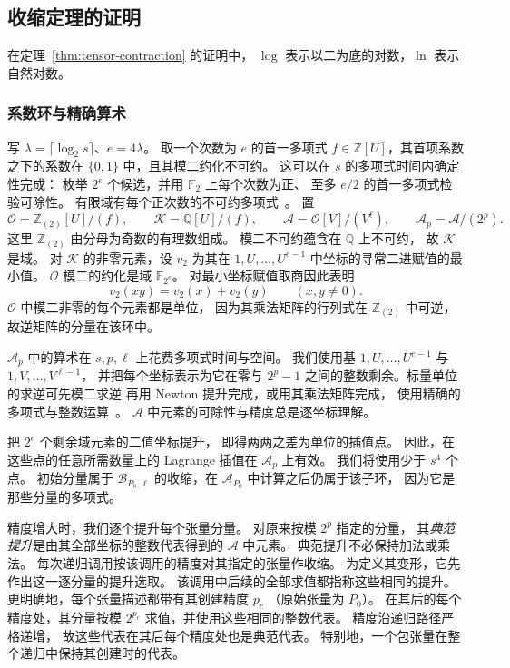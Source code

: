 \subsection{收缩定理的证明}
\label{app:tensor}

在定理~\ref{thm:tensor-contraction} 的证明中，
$\log$ 表示以二为底的对数，$\ln$ 表示自然对数。

\subsubsection{系数环与精确算术}
\label{subsec:tensor-arithmetic}

写 $\lambda=\lceil\log_2 s\rceil$、$e=4\lambda$。
取一个次数为 $e$ 的首一多项式
$f\in\mathbb Z[U]$，其首项系数之下的系数在 $\{0,1\}$
中，且其模二约化不可约。
这可以在 $s$ 的多项式时间内确定性完成：
枚举 $2^e$ 个候选，并用 $\mathbb F_2$ 上每个次数为正、
至多 $e/2$ 的首一多项式检验可除性。
有限域有每个正次数的不可约多项式~\cite{vzGG13}。
置
\[
 \mathcal O=\mathbb Z_{(2)}[U]/(f),\qquad
 \mathcal K=\mathbb Q[U]/(f),\qquad
 \mathcal A=\mathcal O[V]/(V^\ell),\qquad
 \mathcal A_p=\mathcal A/(2^p).
\]
这里 $\mathbb Z_{(2)}$
由分母为奇数的有理数组成。
模二不可约蕴含在 $\mathbb Q$ 上不可约，
故 $\mathcal K$ 是域。
对 $\mathcal K$ 的非零元素，设 $v_2$
为其在 $1,U,\ldots,U^{e-1}$
中坐标的寻常二进赋值的最小值。
$\mathcal O$ 模二的约化是域 $\mathbb F_{2^e}$。
对最小坐标赋值取商因此表明
\[
 v_2(xy)=v_2(x)+v_2(y)\qquad(x,y\ne0).
\]
$\mathcal O$ 中模二非零的每个元素都是单位，
因为其乘法矩阵的行列式在 $\mathbb Z_{(2)}$
中可逆，故逆矩阵的分量在该环中。

$\mathcal A_p$ 中的算术在 $s,p,\ell$
上花费多项式时间与空间。
我们使用基 $1,U,\ldots,U^{e-1}$
与 $1,V,\ldots,V^{\ell-1}$，
并把每个坐标表示为它在零与 $2^p-1$
之间的整数剩余。标量单位的求逆可先模二求逆
再用 Newton 提升完成，或用其乘法矩阵完成，
使用精确的多项式与整数运算~\cite{vzGG13}。
$\mathcal A$ 中元素的可除性与精度总是逐坐标理解。

把 $2^e$ 个剩余域元素的二值坐标提升，
即得两两之差为单位的插值点。
因此，在这些点的任意所需数量上的 Lagrange
插值在 $\mathcal A_p$ 上有效。
我们将使用少于 $s^4$ 个点。
初始分量属于 $\mathcal B_{P_0,\ell}$
的收缩，在 $\mathcal A_{P_0}$ 中计算之后仍属于该子环，
因为它是那些分量的多项式。

精度增大时，我们逐个提升每个张量分量。
对原来按模 $2^p$ 指定的分量，
其\emph{典范提升}是由其全部坐标的整数代表得到的
$\mathcal A$ 中元素。
典范提升不必保持加法或乘法。
每次递归调用按该调用的精度对其指定的张量作收缩。
为定义其变形，它先作出这一逐分量的提升选取。
该调用中后续的全部求值都指称这些相同的提升。
更明确地，每个张量描述都带有其创建精度 $p_c$
（原始张量为 $P_0$）。
在其后的每个精度处，其分量按模 $2^{p_c}$
求值，并使用这些相同的整数代表。
精度沿递归路径严格递增，
故这些代表在其后每个精度处也是典范代表。
特别地，一个包张量在整个递归中保持其创建时的代表。

